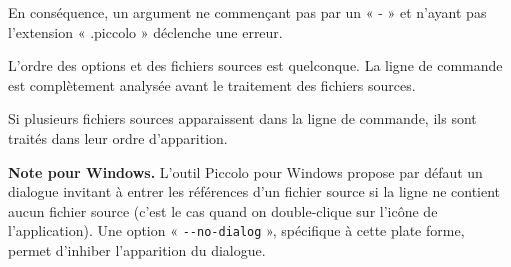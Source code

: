 En conséquence, un argument ne commençant pas par un « - » et n’ayant pas l’extension « .piccolo » déclenche une erreur.

L’ordre des options et des fichiers sources est quelconque. La ligne de commande est complètement analysée avant le traitement des fichiers sources.

Si plusieurs fichiers sources apparaissent dans la ligne de commande, ils sont traités dans leur ordre d’apparition.

{\bf Note pour Windows.} L’outil Piccolo pour Windows propose par défaut un dialogue invitant à entrer les références d’un fichier source si la ligne ne contient aucun fichier source (c’est le cas quand on double-clique sur l’icône de l’application). Une option « \texttt{-{-}no-dialog} », spécifique à cette plate forme, permet d'inhiber l’apparition du dialogue.

